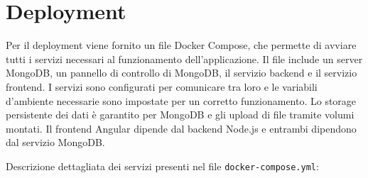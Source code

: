 \documentclass[12pt,a4paper,openright,twoside]{book}
\begin{document}

\chapter{Deployment}

Per il deployment viene fornito un file Docker Compose, che permette di avviare tutti i servizi necessari al funzionamento dell'applicazione. Il file include un server MongoDB, un pannello di controllo di MongoDB, il servizio backend e il servizio frontend. I servizi sono configurati per comunicare tra loro e le variabili d'ambiente necessarie sono impostate per un corretto funzionamento. Lo storage persistente dei dati è garantito per MongoDB e gli upload di file tramite volumi montati. Il frontend Angular dipende dal backend Node.js e entrambi dipendono dal servizio MongoDB.

Descrizione dettagliata dei servizi presenti nel file \texttt{docker-compose.yml}:
\end{document}
